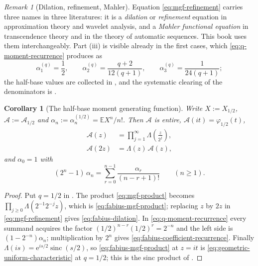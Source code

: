 \documentclass[11pt,oneside,openany]{book}
\newtheorem{corollary}[corollary]{Corollary}
\theoremstyle{definition}
\theoremstyle{remark}
\newtheorem{remark}[remark]{Remark}
\newcommand{\e}{\mathrm e}
\newcommand{\defeq}{\mathrel{:=}}
\begin{document}
\begin{remark}[Dilation, refinement, Mahler]\label{rem:mgf-names}
Equation \eqref{eq:mgf-refinement} carries three names in three literatures: it is a
\emph{dilation} or \emph{refinement} equation in approximation theory and wavelet analysis,
and a \emph{Mahler functional equation} in transcendence theory and in the theory of automatic
sequences.  This book uses them interchangeably.  Part (iii) is visible already in the first
cases, which \eqref{eq:q-moment-recurrence} produces as
\[
 \alpha^{(q)}_1=\frac12,
 \qquad
 \alpha^{(q)}_2=\frac{q+2}{12(q+1)},
 \qquad
 \alpha^{(q)}_3=\frac1{24(q+1)};
\]
the half-base values are collected in , and the systematic
clearing of the denominators is .
\end{remark}

\begin{corollary}[The half-base moment generating function]\label{lem:fabius-moment-dilation}
Write $X\defeq X_{1/2}$, $\mathcal A\defeq\mathcal A_{1/2}$ and
$\alpha_n\defeq\alpha^{(1/2)}_n=\mathbb EX^n/n!$.  Then $\mathcal A$ is entire,
$\mathcal A(it)=\varphi_{1/2}(t)$,
\begin{align}
 \mathcal A(z)&=\prod_{j=1}^{\infty}\Lambda\!\left(\frac z{2^j}\right),
 \label{eq:fabius-mgf-product}\\
 \mathcal A(2z)&=\Lambda(z)\,\mathcal A(z),
 \label{eq:fabius-dilation}
\end{align}
and $\alpha_0=1$ with
\begin{equation}\label{eq:fabius-coefficient-recurrence}
 (2^n-1)\,\alpha_n=\sum_{r=0}^{n-1}\frac{\alpha_r}{(n-r+1)!}
 \qquad(n\ge1).
\end{equation}
\end{corollary}

\begin{proof}
Put $q=1/2$ in .  The product
\eqref{eq:mgf-product} becomes $\prod_{j\ge0}\Lambda(2^{-1}2^{-j}z)$, which is
\eqref{eq:fabius-mgf-product}; replacing $z$ by $2z$ in \eqref{eq:mgf-refinement} gives
\eqref{eq:fabius-dilation}.  In \eqref{eq:q-moment-recurrence} every summand acquires the
factor $(1/2)^{n-r}(1/2)^r=2^{-n}$ and the left side is $(1-2^{-n})\alpha_n$;
multiplication by $2^n$ gives \eqref{eq:fabius-coefficient-recurrence}.  Finally
$\Lambda(is)=\e^{is/2}\operatorname{sinc}(s/2)$, so \eqref{eq:fabius-mgf-product} at
$z=it$ is \eqref{eq:geometric-uniform-characteristic} at $q=1/2$; this is the sinc product
of .
\end{proof}
\end{document}
